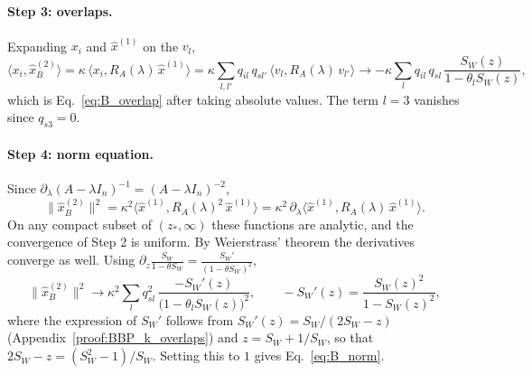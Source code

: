 \paragraph{Step 3: overlaps.}
Expanding $x_i$ and $\hat x^{(1)}$ on the $v_l$,
\begin{equation}
    \langle x_i, \hat x^{(2)}_B\rangle = \kappa\, \langle x_i, R_A(\lambda)\, \hat x^{(1)}\rangle
    = \kappa \sum_{l,l'} q_{il}\, q_{sl'}\, \langle v_l, R_A(\lambda)\, v_{l'}\rangle
    \longrightarrow
    -\kappa \sum_{l} q_{il}\, q_{sl}\, \frac{S_W(z)}{1-\theta_l S_W(z)} ,
\end{equation}
which is Eq.~\eqref{eq:B_overlap} after taking absolute values. The term $l = 3$ vanishes since $q_{s3} = 0$.

\paragraph{Step 4: norm equation.}
Since $\partial_\lambda (A-\lambda I_n)^{-1} = (A-\lambda I_n)^{-2}$,
\begin{equation}
    \big\|\hat x^{(2)}_B\big\|^2 = \kappa^2 \langle \hat x^{(1)}, R_A(\lambda)^2\, \hat x^{(1)}\rangle
    = \kappa^2\, \partial_\lambda \langle \hat x^{(1)}, R_A(\lambda)\, \hat x^{(1)}\rangle .
\end{equation}
On any compact subset of $(z_*,\infty)$ these functions are analytic, and the convergence of Step 2 is uniform.
By Weierstrass' theorem the derivatives converge as well. Using
$\partial_z \frac{S_W}{1-\theta S_W} = \frac{S_W'}{(1-\theta S_W)^2}$,
\begin{equation}
    \big\|\hat x^{(2)}_B\big\|^2 \longrightarrow
    \kappa^2 \sum_l q_{sl}^2\, \frac{-S_W'(z)}{\big(1-\theta_l S_W(z)\big)^2} ,
    \qquad
    -S_W'(z) = \frac{S_W(z)^2}{1-S_W(z)^2},
\end{equation}
where the expression of $S_W'$ follows from $S_W'(z) = S_W/(2S_W - z)$ (Appendix~\ref{proof:BBP_k_overlaps}) and $z = S_W + 1/S_W$,
so that $2S_W - z = (S_W^2-1)/S_W$. Setting this to $1$ gives Eq.~\eqref{eq:B_norm}.

